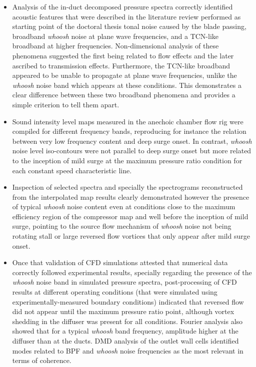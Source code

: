 \begin{itemize}
	\item Analysis of the in-duct decomposed pressure spectra correctly identified acoustic features that were described in the literature review performed as starting point of the doctoral thesis tonal noise caused by the blade passing,  broadband \emph{whoosh} noise at plane wave frequencies, and a TCN-like broadband at higher frequencies. Non-dimensional analysis of these phenomena suggested the first being related to flow effects and the later ascribed to transmission effects. Furthermore, the TCN-like broadband appeared to be unable to propagate at plane wave frequencies, unlike the \emph{whoosh} noise band which appears at these conditions. This demonstrates a clear difference between these two broadband phenomena and provides a simple criterion to tell them apart.

	\item Sound intensity level maps measured in the anechoic chamber flow rig were compiled for different frequency bands, reproducing for instance the relation between very low frequency content and deep surge onset. In contrast, \emph{whoosh} noise level iso-contours were not parallel to deep surge onset but more related to the inception of mild surge at the maximum pressure ratio condition for each constant speed characteristic line.

	\item Inspection of selected spectra and specially the spectrograms reconstructed from the interpolated map results clearly demonstrated however the presence of typical \emph{whoosh} noise content even at conditions close to the maximum efficiency region of the compressor map and well before the inception of mild surge, pointing to the source flow mechanism of \emph{whoosh} noise not being rotating stall or large reversed flow vortices  that only appear after mild surge onset.

	\item Once that validation of CFD simulations attested that numerical data correctly followed experimental results, specially regarding the presence of the \emph{whoosh} noise band in simulated pressure spectra, post-processing of CFD results at different operating conditions (that were simulated using experimentally-measured boundary conditions) indicated that reversed flow did not appear until the maximum pressure ratio point, although vortex shedding in the diffuser was present for all conditions. Fourier analysis also showed that for a typical \emph{whoosh} band frequency, amplitude higher at the diffuser than at the ducts. DMD analysis of the outlet wall cells identified modes related to BPF and \emph{whoosh} noise frequencies as the most relevant in terms of coherence.


\end{itemize}
